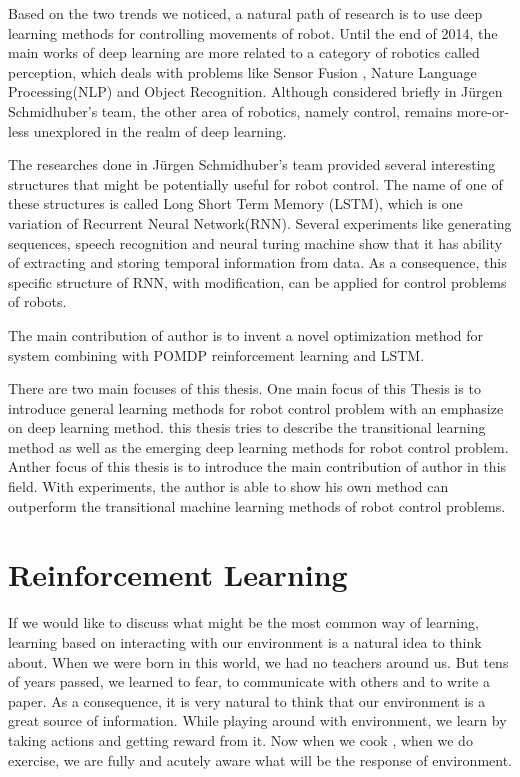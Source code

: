 \documentclass[officiallayout]{tktla}
\begin{document}
Based on the two trends we noticed, a natural path of research is to use deep learning methods for controlling movements of robot. Until the end of 2014,  the main works of deep learning are more related to a category of robotics called perception, which deals with problems like Sensor Fusion \cite{OConnor2013}, Nature Language Processing(NLP)\cite{Cho2014} and Object Recognition\cite{Lenz2013}\cite{Hoffman2014}. Although considered briefly in J{\"u}rgen Schmidhuber's team\cite{Mayer2006}, the other area of robotics, namely control, remains more-or-less unexplored in the realm of deep learning.

The researches done in J{\"u}rgen Schmidhuber's team provided several interesting structures that might be potentially useful for robot control. The name of one of these structures is called Long Short Term Memory (LSTM), which is one variation of Recurrent Neural Network(RNN). Several experiments like generating sequences\cite{Graves2013}, speech recognition\cite{Graves2013b} and neural turing machine \cite{Graves2014} show that it has ability of extracting and storing temporal information from data. As a consequence, this specific structure of RNN, with modification, can be applied for control problems of robots.

The main contribution of author is to invent a novel optimization method for system combining with POMDP reinforcement learning and LSTM.

There are two main focuses of this thesis. One main focus of this Thesis is to introduce general learning methods for robot control problem with an emphasize on deep learning method. this thesis tries to describe the transitional learning method as well as the emerging deep learning methods for robot control problem. Anther focus of this thesis is to introduce the main contribution of author in this field. With experiments, the author is able to show his own method can outperform the transitional machine learning methods of robot control problems.

\chapter{Reinforcement Learning}

If we would like to discuss what might be the most common way of learning, learning based on interacting with our environment is a natural idea to think about. When we were born in this world, we had no teachers around us. But tens of years passed, we learned to fear, to communicate with others and to write a paper. As a consequence, it is very natural to think that our environment is a great source of information. While playing around with environment, we learn by taking actions and getting reward from it. Now when we cook , when we do exercise, we are fully and acutely aware what will be the response of environment.
\end{document}
